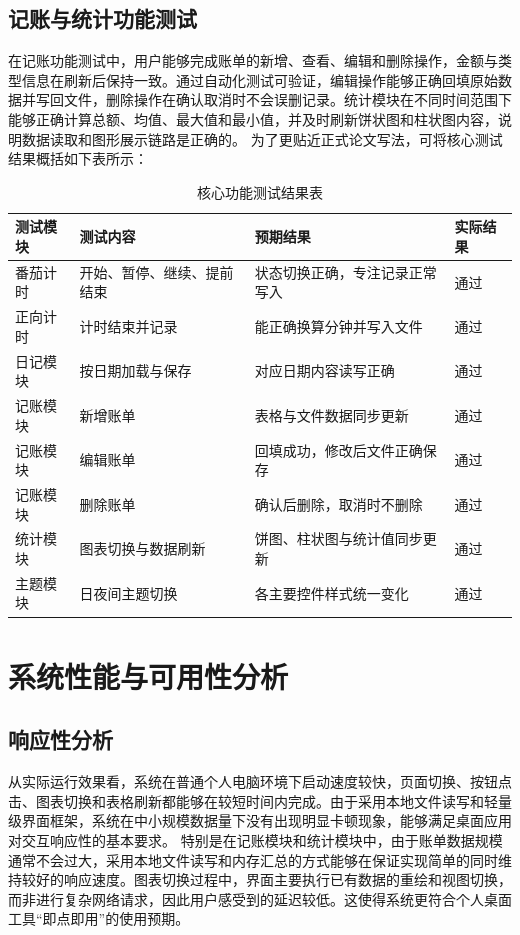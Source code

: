 \subsection{记账与统计功能测试}
在记账功能测试中，用户能够完成账单的新增、查看、编辑和删除操作，金额与类型信息在刷新后保持一致。通过自动化测试可验证，编辑操作能够正确回填原始数据并写回文件，删除操作在确认取消时不会误删记录。统计模块在不同时间范围下能够正确计算总额、均值、最大值和最小值，并及时刷新饼状图和柱状图内容，说明数据读取和图形展示链路是正确的。
为了更贴近正式论文写法，可将核心测试结果概括如下表所示：

\begin{table}[h]
\centering
\caption{核心功能测试结果表}
\begin{tabular}{|l|l|l|l|}
\hline
测试模块 & 测试内容 & 预期结果 & 实际结果 \\
\hline
番茄计时 & 开始、暂停、继续、提前结束 & 状态切换正确，专注记录正常写入 & 通过 \\
正向计时 & 计时结束并记录 & 能正确换算分钟并写入文件 & 通过 \\
日记模块 & 按日期加载与保存 & 对应日期内容读写正确 & 通过 \\
记账模块 & 新增账单 & 表格与文件数据同步更新 & 通过 \\
记账模块 & 编辑账单 & 回填成功，修改后文件正确保存 & 通过 \\
记账模块 & 删除账单 & 确认后删除，取消时不删除 & 通过 \\
统计模块 & 图表切换与数据刷新 & 饼图、柱状图与统计值同步更新 & 通过 \\
主题模块 & 日夜间主题切换 & 各主要控件样式统一变化 & 通过 \\
\hline
\end{tabular}
\end{table}

\section{系统性能与可用性分析}

\subsection{响应性分析}
从实际运行效果看，系统在普通个人电脑环境下启动速度较快，页面切换、按钮点击、图表切换和表格刷新都能够在较短时间内完成。由于采用本地文件读写和轻量级界面框架，系统在中小规模数据量下没有出现明显卡顿现象，能够满足桌面应用对交互响应性的基本要求。
特别是在记账模块和统计模块中，由于账单数据规模通常不会过大，采用本地文件读写和内存汇总的方式能够在保证实现简单的同时维持较好的响应速度。图表切换过程中，界面主要执行已有数据的重绘和视图切换，而非进行复杂网络请求，因此用户感受到的延迟较低。这使得系统更符合个人桌面工具“即点即用”的使用预期。

